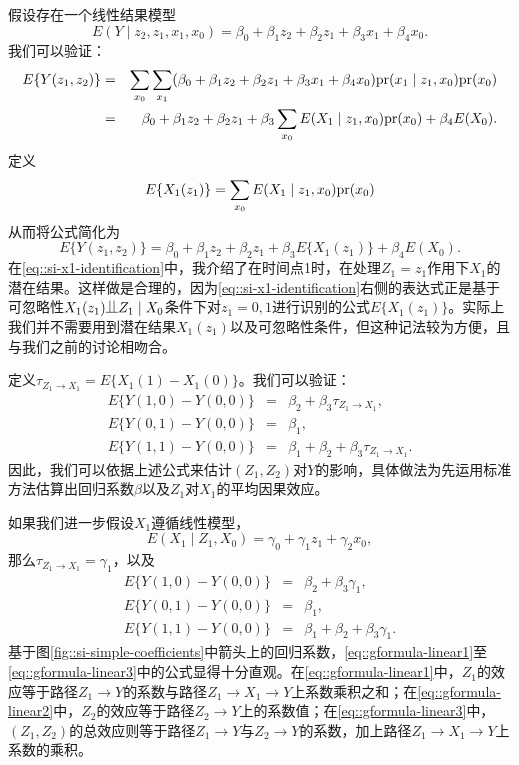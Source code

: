 \begin{example}\label{example::linear-si}
假设存在一个线性结果模型
$$
E(Y\mid z_2,z_1,x_1, x_0) = \beta_0+ \beta_1 z_2 + \beta_2 z_1   + \beta_3  x_1  +\beta_4 x_0.
$$
我们可以验证：
\begin{eqnarray*}
E\{ Y(z_1, z_2) \}  &=& \sum_{x_0} \sum_{x_1} (\beta_0+ \beta_1 z_2 + \beta_2 z_1 + \beta_3 x_1  +\beta_4 x_0) \textup{pr}(x_1\mid   z_1, x_0) \textup{pr}(x_0)  \\
&=& \beta_0 + \beta_1 z_2 + \beta_2  z_1  +  \beta_3 \sum_{x_0} E(X_1\mid z_1, x_0) \textup{pr}(x_0)  +\beta_4 E(X_0) .
\end{eqnarray*}
定义
\begin{equation}\label{eq::si-x1-identification}
E\{ X_1(z_1)\} = \sum_{x_0} E(X_1\mid z_1, x_0) \textup{pr}(x_0) 
\end{equation}
从而将公式简化为
$$
E\{ Y(z_1, z_2) \}  = \beta_0 + \beta_1 z_2 + \beta_2 z_1  + \beta_3 E\{ X_1(z_1)\}   +\beta_4 E(X_0) .
$$
在\eqref{eq::si-x1-identification}中，我介绍了在时间点1时，在处理$Z_1=z_1$作用下$X_1$的潜在结果。这样做是合理的，因为\eqref{eq::si-x1-identification}右侧的表达式正是基于可忽略性$X_1(z_1)\ind Z_1 \mid X_0$条件下对$z_1  = 0, 1$进行识别的公式$E\{ X_1(z_1)\} $。实际上我们并不需要用到潜在结果$X_1(z_1)$以及可忽略性条件，但这种记法较为方便，且与我们之前的讨论相吻合。
 
 
定义$\tau_{Z_1\rightarrow X_1} = E\{ X_1(1)  - X_1(0)\}$。我们可以验证：
\begin{eqnarray*}
E\{ Y(1,0)  - Y(0,0)\} &=& \beta_2 +  \beta_3 \tau_{Z_1\rightarrow X_1},\\
E\{ Y(0,1)  - Y(0,0)\} &=& \beta_1,\\
E\{ Y(1,1)  - Y(0,0)\} &=& \beta_1 +  \beta_2 + \beta_3 \tau_{Z_1\rightarrow X_1}.
\end{eqnarray*}
因此，我们可以依据上述公式来估计$(Z_1,Z_2)$对$Y$的影响，具体做法为先运用标准方法估算出回归系数$\beta$以及$Z_1$对$X_1$的平均因果效应。 


如果我们进一步假设$X_1$遵循线性模型，
$$
E(X_1\mid Z_1, X_0) = \gamma_0 + \gamma_1 z_1 + \gamma_2 x_0,
$$
那么$\tau_{Z_1\rightarrow X_1} = \gamma_1$，以及
\begin{eqnarray} 
E\{ Y(1,0)  - Y(0,0)\} &=& \beta_2 +  \beta_3 \gamma_1,  \label{eq::gformula-linear1}\\
E\{ Y(0,1)  - Y(0,0)\} &=& \beta_1, \label{eq::gformula-linear2}\\
E\{ Y(1,1)  - Y(0,0)\} &=& \beta_1 +  \beta_2 + \beta_3 \gamma_1. \label{eq::gformula-linear3} 
\end{eqnarray}
基于图\ref{fig::si-simple-coefficients}中箭头上的回归系数，\eqref{eq::gformula-linear1}至\eqref{eq::gformula-linear3}中的公式显得十分直观。在\eqref{eq::gformula-linear1}中，$Z_1$的效应等于路径$Z_1\rightarrow Y$的系数与路径$Z_1\rightarrow X_1\rightarrow Y$上系数乘积之和；在\eqref{eq::gformula-linear2}中，$Z_2$的效应等于路径$Z_2\rightarrow Y$上的系数值；在\eqref{eq::gformula-linear3}中，$(Z_1,Z_2)$的总效应则等于路径$Z_1\rightarrow Y$与$Z_2\rightarrow Y$的系数，加上路径$Z_1\rightarrow X_1\rightarrow Y$上系数的乘积。
\end{example}


